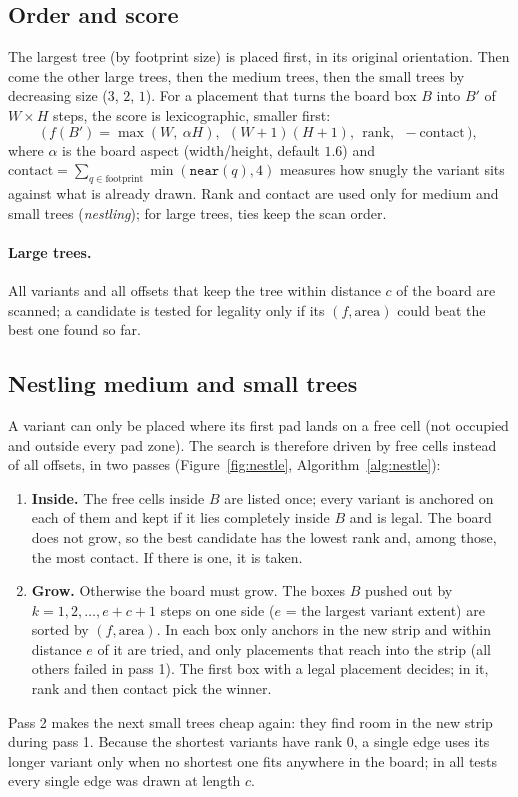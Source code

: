 \documentclass[11pt,a4paper]{article}
\theoremstyle{remark}
\begin{document}
\subsection{Order and score}
The largest tree (by footprint size) is placed first, in its original orientation. Then come the other large trees,
then the medium trees, then the small trees by decreasing size ($3$, $2$, $1$). For a placement that turns the board
box $B$ into $B'$ of $W\times H$ steps, the score is lexicographic, smaller first:
\[
\bigl(\,f(B')=\max(W,\ \alpha H),\ \ (W+1)(H+1),\ \ \text{rank},\ \ -\mathrm{contact}\,\bigr),
\]
where $\alpha$ is the board aspect (width/height, default $1.6$) and
$\mathrm{contact}=\sum_{q\in\text{footprint}}\min(\texttt{near}(q),4)$ measures how snugly the variant sits against what
is already drawn. Rank and contact are used only for medium and small trees (\emph{nestling}); for large trees, ties
keep the scan order.

\paragraph{Large trees.} All variants and all offsets that keep the tree within distance $c$ of the board are
scanned; a candidate is tested for legality only if its $(f,\text{area})$ could beat the best one found so far.

\subsection{Nestling medium and small trees}\label{sec:nestle}

A variant can only be placed where its first pad lands on a free cell (not occupied and outside every pad zone). The
search is therefore driven by free cells instead of all offsets, in two passes (Figure~\ref{fig:nestle},
Algorithm~\ref{alg:nestle}):
\begin{enumerate}[nosep]
  \item \textbf{Inside.} The free cells inside $B$ are listed once; every variant is anchored on each of them and kept
        if it lies completely inside $B$ and is legal. The board does not grow, so the best candidate has the lowest
        rank and, among those, the most contact. If there is one, it is taken.
  \item \textbf{Grow.} Otherwise the board must grow. The boxes $B$ pushed out by $k=1,2,\dots,e+c+1$ steps on one side
        ($e$ = the largest variant extent) are sorted by $(f,\text{area})$. In each box only anchors in the new strip
        and within distance $e$ of it are tried, and only placements that reach into the strip (all others failed in
        pass 1). The first box with a legal placement decides; in it, rank and then contact pick the winner.
\end{enumerate}
Pass 2 makes the next small trees cheap again: they find room in the new strip during pass 1. Because the shortest
variants have rank $0$, a single edge uses its longer variant only when no shortest one fits anywhere in the board;
in all tests every single edge was drawn at length $c$.
\end{document}
